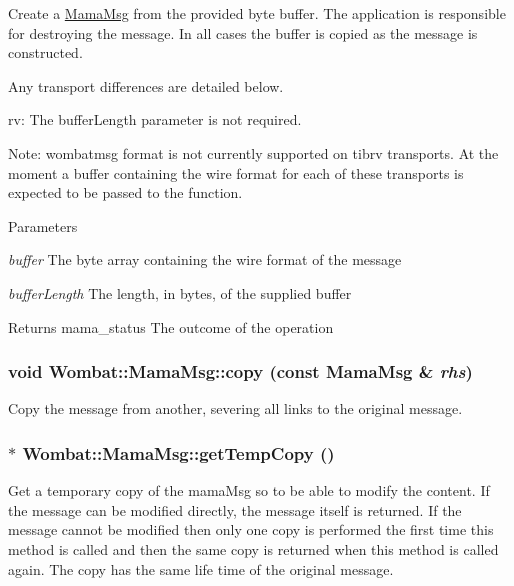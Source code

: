 Create a \hyperlink{classWombat_1_1MamaMsg}{MamaMsg} from the provided byte buffer. The application is responsible for destroying the message. In all cases the buffer is copied as the message is constructed.

Any transport differences are detailed below.

rv: The bufferLength parameter is not required.

Note: wombatmsg format is not currently supported on tibrv transports. At the moment a buffer containing the wire format for each of these transports is expected to be passed to the function.


\begin{DoxyParams}{Parameters}
\item[{\em buffer}]The byte array containing the wire format of the message \item[{\em bufferLength}]The length, in bytes, of the supplied buffer\end{DoxyParams}
\begin{DoxyReturn}{Returns}
mama\_\-status The outcome of the operation 
\end{DoxyReturn}
\hypertarget{classWombat_1_1MamaMsg_acbdde7468cb179ff79958b06ba51cdba}{
\subsubsection[{copy}]{\setlength{\rightskip}{0pt plus 5cm}void Wombat::MamaMsg::copy (const {\bf MamaMsg} \& {\em rhs})}}
\label{classWombat_1_1MamaMsg_acbdde7468cb179ff79958b06ba51cdba}


Copy the message from another, severing all links to the original message. \hypertarget{classWombat_1_1MamaMsg_a7d02fb51be62ecefa65bf81eef0cc1b6}{
\subsubsection[{getTempCopy}]{$\ast$ Wombat::MamaMsg::getTempCopy ()}}
\label{classWombat_1_1MamaMsg_a7d02fb51be62ecefa65bf81eef0cc1b6}


Get a temporary copy of the mamaMsg so to be able to modify the content. If the message can be modified directly, the message itself is returned. If the message cannot be modified then only one copy is performed the first time this method is called and then the same copy is returned when this method is called again. The copy has the same life time of the original message.

